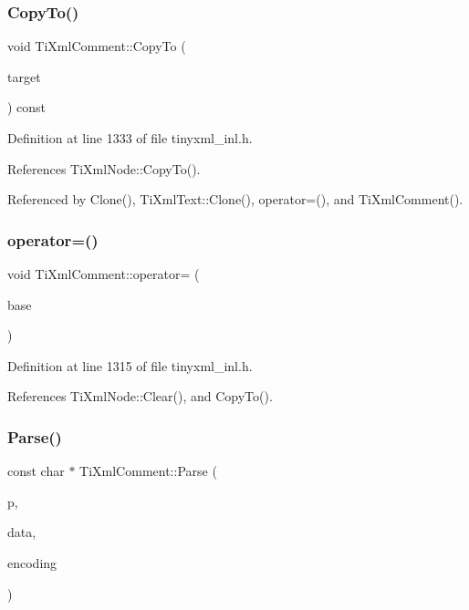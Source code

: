 \subsubsection{\texorpdfstring{Copy\+To()}{CopyTo()}}
{\footnotesize\ttfamily void Ti\+Xml\+Comment\+::\+Copy\+To (\begin{DoxyParamCaption}\item[{\hyperlink{class_ti_xml_comment}{Ti\+Xml\+Comment} $\ast$}]{target }\end{DoxyParamCaption}) const\hspace{0.3cm}{\ttfamily [protected]}}



Definition at line 1333 of file tinyxml\+\_\+inl.\+h.



References Ti\+Xml\+Node\+::\+Copy\+To().



Referenced by Clone(), Ti\+Xml\+Text\+::\+Clone(), operator=(), and Ti\+Xml\+Comment().

\hypertarget{class_ti_xml_comment_a46373f99b65cb960637dccb1f126bd49}{}\label{class_ti_xml_comment_a46373f99b65cb960637dccb1f126bd49} 
\subsubsection{\texorpdfstring{operator=()}{operator=()}}
{\footnotesize\ttfamily void Ti\+Xml\+Comment\+::operator= (\begin{DoxyParamCaption}\item[{const \hyperlink{class_ti_xml_comment}{Ti\+Xml\+Comment} \&}]{base }\end{DoxyParamCaption})}



Definition at line 1315 of file tinyxml\+\_\+inl.\+h.



References Ti\+Xml\+Node\+::\+Clear(), and Copy\+To().

\hypertarget{class_ti_xml_comment_a43bddc18ac057734b41d84653b71d3e0}{}\label{class_ti_xml_comment_a43bddc18ac057734b41d84653b71d3e0} 
\subsubsection{\texorpdfstring{Parse()}{Parse()}}
{\footnotesize\ttfamily const char $\ast$ Ti\+Xml\+Comment\+::\+Parse (\begin{DoxyParamCaption}\item[{const char $\ast$}]{p,  }\item[{\hyperlink{class_ti_xml_parsing_data}{Ti\+Xml\+Parsing\+Data} $\ast$}]{data,  }\item[{\hyperlink{tinyxml_8h_a88d51847a13ee0f4b4d320d03d2c4d96}{Ti\+Xml\+Encoding}}]{encoding }\end{DoxyParamCaption})\hspace{0.3cm}{\ttfamily [virtual]}}



